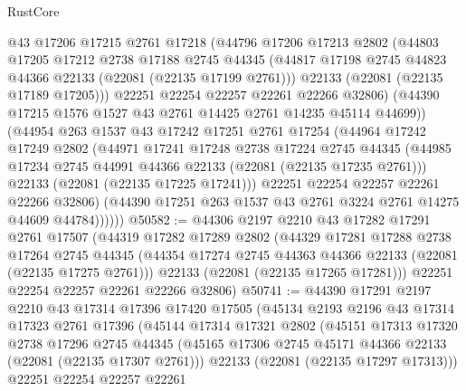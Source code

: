 \begin{lexlean}{RustCore}
\begin{coremodule}
              @43
              @17206
              @17215
              @2761
              @17218
              (@44796
                @17206
                @17213
                @2802
                (@44803
                  @17205
                  @17212
                  @2738
                  @17188
                  @2745
                  @44345
                  (@44817 @17198 @2745 @44823 @44366 @22133 (@22081 (@22135 @17199 @2761)))
                  @22133
                  (@22081 (@22135 @17189 @17205)))
                @22251
                @22254
                @22257
                @22261
                @22266
                @32806)
              (@44390 @17215 @1576 @1527 @43 @2761 @14425 @2761 @14235 @45114 @44699))
            (@44954
              @263
              @1537
              @43
              @17242
              @17251
              @2761
              @17254
              (@44964
                @17242
                @17249
                @2802
                (@44971
                  @17241
                  @17248
                  @2738
                  @17224
                  @2745
                  @44345
                  (@44985 @17234 @2745 @44991 @44366 @22133 (@22081 (@22135 @17235 @2761)))
                  @22133
                  (@22081 (@22135 @17225 @17241)))
                @22251
                @22254
                @22257
                @22261
                @22266
                @32806)
              (@44390 @17251 @263 @1537 @43 @2761 @3224 @2761 @14275 @44609 @44784))))))
@50582 := @44306
    @2197
    @2210
    @43
    @17282
    @17291
    @2761
    @17507
    (@44319
      @17282
      @17289
      @2802
      (@44329
        @17281
        @17288
        @2738
        @17264
        @2745
        @44345
        (@44354 @17274 @2745 @44363 @44366 @22133 (@22081 (@22135 @17275 @2761)))
        @22133
        (@22081 (@22135 @17265 @17281)))
      @22251
      @22254
      @22257
      @22261
      @22266
      @32806)
@50741 := @44390
    @17291
    @2197
    @2210
    @43
    @17314
    @17396
    @17420
    @17505
    (@45134
      @2193
      @2196
      @43
      @17314
      @17323
      @2761
      @17396
      (@45144
        @17314
        @17321
        @2802
        (@45151
          @17313
          @17320
          @2738
          @17296
          @2745
          @44345
          (@45165 @17306 @2745 @45171 @44366 @22133 (@22081 (@22135 @17307 @2761)))
          @22133
          (@22081 (@22135 @17297 @17313)))
        @22251
        @22254
        @22257
        @22261

\end{coremodule}
\end{lexlean}
